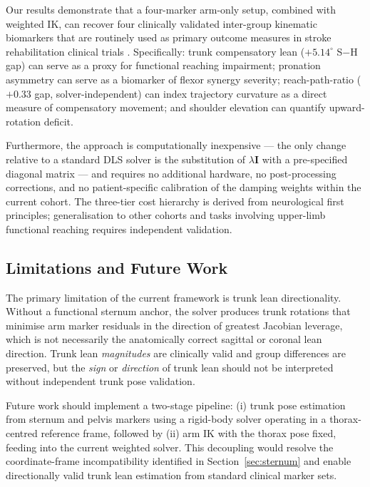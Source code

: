 \documentclass[journal,10pt,twocolumn]{IEEEtran}
\begin{document}
Our results demonstrate that a four-marker arm-only setup, combined with
weighted IK, can recover four clinically validated inter-group kinematic
biomarkers that are routinely used as primary outcome measures in stroke
rehabilitation clinical trials \cite{mccrea2005,cirstea2000}. Specifically:
trunk compensatory lean ($+5.14^{\circ}$ S$-$H gap) can serve as a proxy
for functional reaching impairment; pronation asymmetry can serve as a
biomarker of flexor synergy severity; reach-path-ratio ($+0.33$ gap,
solver-independent) can index trajectory curvature as a direct measure
of compensatory movement; and shoulder elevation can quantify
upward-rotation deficit.

Furthermore, the approach is computationally inexpensive --- the only change
relative to a standard DLS solver is the substitution of $\lambda\mathbf{I}$
with a pre-specified diagonal matrix --- and requires no additional hardware,
no post-processing corrections, and no patient-specific calibration of the
damping weights within the current cohort. The three-tier cost hierarchy is
derived from neurological first principles; generalisation to other cohorts
and tasks involving upper-limb functional reaching requires independent
validation.

\subsection{Limitations and Future Work}

The primary limitation of the current framework is trunk lean
directionality. Without a functional sternum anchor, the solver produces
trunk rotations that minimise arm marker residuals in the direction of
greatest Jacobian leverage, which is not necessarily the anatomically
correct sagittal or coronal lean direction. Trunk lean \emph{magnitudes}
are clinically valid and group differences are preserved, but the
\emph{sign} or \emph{direction} of trunk lean should not be interpreted
without independent trunk pose validation.

Future work should implement a two-stage pipeline: (i) trunk pose
estimation from sternum and pelvis markers using a rigid-body solver
operating in a thorax-centred reference frame, followed by (ii) arm IK
with the thorax pose fixed, feeding into the current weighted solver.
This decoupling would resolve the coordinate-frame incompatibility
identified in Section~\ref{sec:sternum} and enable directionally valid
trunk lean estimation from standard clinical marker sets.
\end{document}
